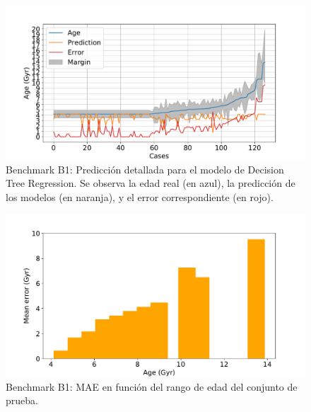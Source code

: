 \begin{figure}[H]
\begin{center}
 \includegraphics[width=0.8\linewidth]{Figuras/Experimentos/B_B1_dtr_2.pdf}
\end{center}
\caption{Benchmark B1: Predicción detallada para el modelo de Decision Tree Regression. Se observa la edad real (en azul), la predicción de los modelos (en naranja), y el error correspondiente (en rojo).}
 \label{fig:benchB1_details_dtr_2}
\end{figure}

\begin{figure}[H]
\begin{center}
 \includegraphics[width=0.8\linewidth]{Figuras/Experimentos/B_B1_dtr_3.pdf}
\end{center}
\caption{Benchmark B1: MAE en función del rango de edad del conjunto de prueba.}
 \label{fig:benchB1_details_dtr_3}
\end{figure}

